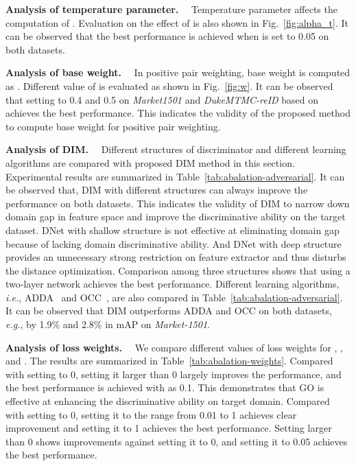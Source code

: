 \documentclass[sigconf]{acmart}
\begin{document}
\textbf{Analysis of temperature parameter.} \ \
Temperature parameter  affects the computation of .
Evaluation on the effect of  is also shown in Fig.~\ref{fig:alpha_t}. It can be observed that the best performance is achieved when  is set to 0.05 on both datasets.

\textbf{Analysis of base weight.} \ \
In positive pair weighting, base weight  is computed as .
Different value of  is evaluated as shown in Fig.~\ref{fig:w}. It can be observed that setting  to 0.4 and 0.5 on \textit{Market1501} and \textit{DukeMTMC-reID} based on  achieves the best performance. This indicates the validity of the proposed method to compute base weight  for positive pair weighting.

\textbf{Analysis of DIM.} \ \
Different structures of discriminator and different learning algorithms are compared with proposed DIM method in this section. Experimental results are summarized in Table~\ref{tab:abalation-adversarial}. It can be observed that, DIM with different structures can always improve the performance on both datasets.
This indicates the validity of DIM to narrow down domain gap in feature space and improve the discriminative ability on the target dataset.
DNet with shallow structure is not effective at eliminating domain gap because of lacking domain discriminative ability. And DNet with deep structure provides an unnecessary strong restriction on feature extractor and thus disturbs the distance optimization. Comparison among three structures shows that using a two-layer network achieves the best performance. Different learning algorithms, \textit{i.e.}, ADDA~\cite{tzeng2017adversarial} and OCC~\cite{huang2019domain}, are also compared in Table~\ref{tab:abalation-adversarial}.
It can be observed that DIM outperforms ADDA and OCC on both datasets, \textit{e.g.}, by 1.9\% and 2.8\% in mAP on \textit{Market-1501}.

\textbf{Analysis of loss weights.} \ \
We compare different values of loss weights for , , and . The results are summarized in Table~\ref{tab:abalation-weights}. Compared with setting  to 0, setting it larger than 0 largely improves the performance, and the best performance is achieved with  as 0.1. This demonstrates that GO is effective at enhancing the discriminative ability on target domain. Compared with setting  to 0, setting it to the range from 0.01 to 1 achieves clear improvement and setting it to 1 achieves the best performance. Setting  larger than 0 shows improvements against setting it to 0, and setting it to 0.05 achieves the best performance.
\end{document}
